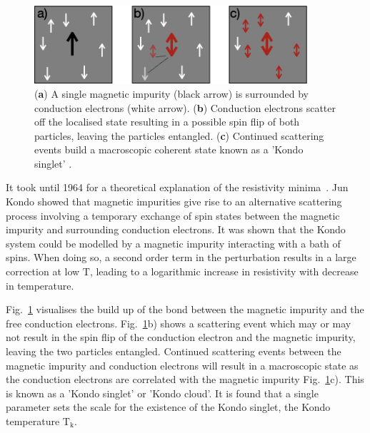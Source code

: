 \begin{figure}[!hbt]
  \begin{center}
    \includegraphics[width=0.9\textwidth]{figures/ch2/crop_FiguresMaster.009.png}
    \caption[Kondo effect in bulk materials]{\label{fig:ch2/kondo_bulkdiagram} 
    (\textbf{a}) A single magnetic impurity (black arrow) is surrounded by conduction electrons (white arrow). (\textbf{b}) Conduction electrons scatter off the localised state resulting in a possible spin flip of both particles, leaving the particles entangled. (\textbf{c}) Continued scattering events build a macroscopic coherent state known as a 'Kondo singlet' .
      }
  \end{center}
\end{figure}

It took until 1964 for a theoretical explanation of the resistivity minima~\cite{jun_kondo}. Jun Kondo showed that magnetic impurities give rise to an alternative scattering process involving a temporary exchange of spin states between the magnetic impurity and surrounding conduction electrons.  
It was shown that the Kondo system could be modelled by a magnetic impurity interacting with a bath of spins. When doing so, a second order term in the perturbation results in a large correction at low $\mathrm{T}$, leading to a logarithmic increase in resistivity with decrease in temperature. 

Fig.~\ref{fig:ch2/kondo_bulkdiagram} visualises the build up of the bond between the magnetic impurity and the free conduction electrons. 
Fig.~\ref{fig:ch2/kondo_bulkdiagram}b) shows a scattering event which may or may not result in the spin flip of the conduction electron and the magnetic impurity, leaving the two particles entangled. Continued scattering events between the magnetic impurity and conduction electrons will result in a macroscopic state as the conduction electrons are correlated with the magnetic impurity Fig.~\ref{fig:ch2/kondo_bulkdiagram}c). This is known as a 'Kondo singlet' or 'Kondo cloud'. It is found that a single parameter sets the scale for the existence of the Kondo singlet, the Kondo temperature $\mathrm{T_k}$. 

